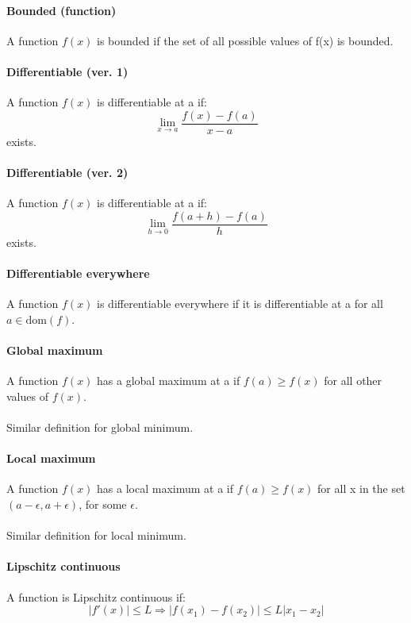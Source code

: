 \documentclass{article}
\begin{document}
\paragraph{Bounded (function)}
A function $ f(x) $ is bounded if the set of all possible values of f(x) is bounded.
\paragraph{Differentiable (ver. 1)}
A function $ f(x) $ is differentiable at a if:
\begin{equation}
\lim_{x \to a}\frac{f(x) - f(a)}{x - a}
\end{equation}
exists.
\paragraph{Differentiable (ver. 2)}
A function $ f(x) $ is differentiable at a if:
\begin{equation}
\lim_{h \to 0}\frac{f(a + h) - f(a)}{h}
\end{equation}
exists.
\paragraph{Differentiable everywhere}
A function $ f(x) $ is differentiable everywhere if it is differentiable at a for all $ a \in \textrm{dom}(f) $.
\paragraph{Global maximum}
A function $ f(x) $ has a global maximum at a if $ f(a) \geq f(x) $ for all other values of $ f(x) $.
\\\\
Similar definition for global minimum.
\paragraph{Local maximum}
A function $ f(x) $ has a local maximum at a if $ f(a) \geq f(x) $ for all x in the set $ (a - \epsilon, a + \epsilon) $, for some $ \epsilon $.
\\\\
Similar definition for local minimum.
\paragraph{Lipschitz continuous}
A function is Lipschitz continuous if:
\begin{equation}
|f'(x)| \leq L \Rightarrow |f(x_{1}) - f(x_{2})| \leq L|x_{1} - x_{2}|
\end{equation}
\end{document}

